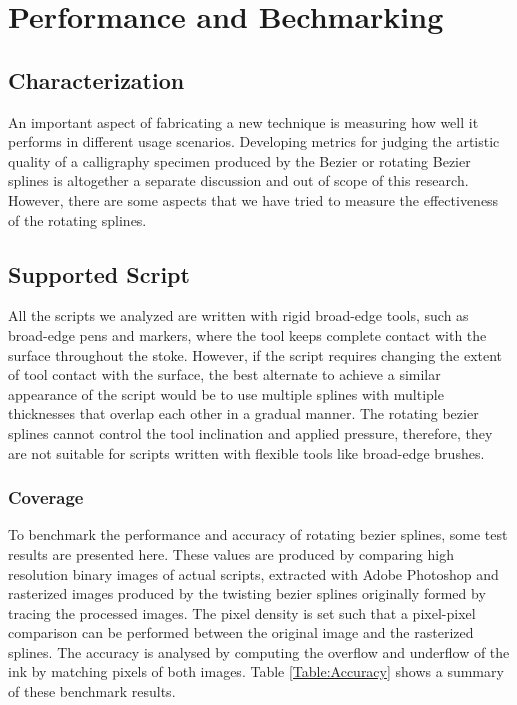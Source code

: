 \section{Performance and Bechmarking}
\label{Chapter:Performance}

\subsection{Characterization}
An important aspect of fabricating a new technique is measuring how well it performs in different usage scenarios. Developing metrics for judging the artistic quality of a calligraphy specimen produced by the Bezier or rotating Bezier splines is altogether a separate discussion and out of scope of this research. However, there are some aspects that we have tried to measure the effectiveness of the rotating splines.

\subsection{Supported Script}
All the scripts we analyzed are written with rigid broad-edge tools, such as broad-edge pens and markers, where the tool keeps complete contact with the surface throughout the stoke. However, if the script requires changing the extent of tool contact with the surface, the best alternate to achieve a similar appearance of the script would be to use multiple splines with multiple thicknesses that overlap each other in a gradual manner. The rotating bezier splines cannot control the tool inclination and applied pressure, therefore, they are not suitable for scripts written with flexible tools like broad-edge brushes.

\subsubsection{Coverage}
To benchmark the performance and accuracy of rotating bezier splines, some test results are presented here. These values are produced by comparing high resolution binary images of actual scripts, extracted with Adobe Photoshop and rasterized images produced by the twisting bezier splines originally formed by tracing the processed images. The pixel density is set such that a pixel-pixel comparison can be performed between the original image and the rasterized splines. The accuracy is analysed by computing the overflow and underflow of the ink by matching pixels of both images. Table \ref{Table:Accuracy} shows a summary of these benchmark results.

